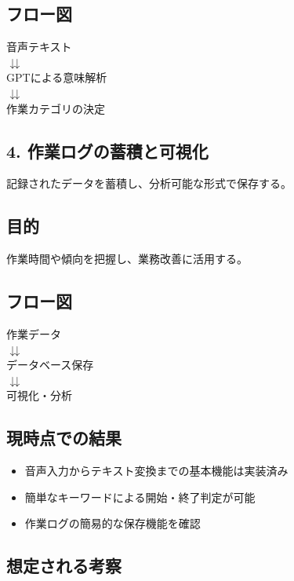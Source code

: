 \documentclass[a4paper,12pt,ja=standard,lualatex]{bxjsarticle}
\begin{document}
\subsection*{フロー図}
\begin{center}
音声テキスト \\
\(\downdownarrows\) \\
GPTによる意味解析 \\
\(\downdownarrows\) \\
作業カテゴリの決定
\end{center}

\subsection*{4. 作業ログの蓄積と可視化}

記録されたデータを蓄積し、分析可能な形式で保存する。

\subsection*{目的}
作業時間や傾向を把握し、業務改善に活用する。

\subsection*{フロー図}
\begin{center}
作業データ \\
\(\downdownarrows\) \\
データベース保存 \\
\(\downdownarrows\) \\
可視化・分析
\end{center}

\subsection{現時点での結果}
\begin{itemize}
    \item 音声入力からテキスト変換までの基本機能は実装済み
    \item 簡単なキーワードによる開始・終了判定が可能
    \item 作業ログの簡易的な保存機能を確認
\end{itemize}

\subsection{想定される考察}
\end{document}
